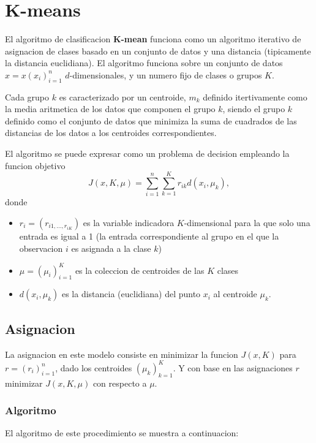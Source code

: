 \documentclass[11pt,]{article}
\begin{document}
\section{K-means}\label{k-means}

El algoritmo de clasificacion \textbf{K-mean} funciona como un algoritmo
iterativo de asignacion de clases basado en un conjunto de datos y una
distancia (tipicamente la distancia euclidiana). El algoritmo funciona
sobre un conjunto de datos \(x=x(x_i)^{n}_{i=1}\) \(d\)-dimensionales, y
un numero fijo de clases o grupos \(K\).

Cada grupo \(k\) es caracterizado por un centroide, \(m_k\) definido
itertivamente como la media aritmetica de los datos que componen el
grupo \(k\), siendo el grupo \(k\) definido como el conjunto de datos
que minimiza la suma de cuadrados de las distancias de los datos a los
centroides correspondientes.

El algoritmo se puede expresar como un problema de decision empleando la
funcion objetivo \[
J(x,K,\mu)=\sum_{i=1}^{n}\sum_{k=1}^{K}r_{ik} d(x_i,\mu_k),
\] donde

\begin{itemize}
\item
  \(r_i=(r_{i1,\ldots,r_{iK}})\) es la variable indicadora
  \(K\)-dimensional para la que solo una entrada es igual a 1 (la
  entrada correspondiente al grupo en el que la observacion \(i\) es
  asignada a la clase \(k\))
\item
  \(\mu=(\mu_i)_{i=1}^{K}\) es la coleccion de centroides de las \(K\)
  clases
\item
  \(d(x_i,\mu_k)\) es la distancia (euclidiana) del punto \(x_i\) al
  centroide \(\mu_k\).
\end{itemize}

\subsection{Asignacion}\label{asignacion}

La asignacion en este modelo consiste en minimizar la funcion \(J(x,K)\)
para \(r=(r_{i})_{i=1}^{n}\), dado los centroides \((\mu_k)_{k=1}^{K}\).
Y con base en las asignaciones \(r\) minimizar \(J(x,K,\mu)\) con
respecto a \(\mu\).

\subsubsection{Algoritmo}\label{algoritmo}

El algoritmo de este procedimiento se muestra a continuacion:
\end{document}
